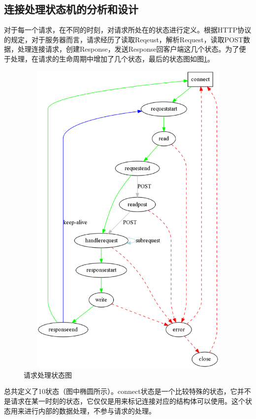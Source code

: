 \documentclass[twoside, xetex]{report}
\begin{document}
\subsection{连接处理状态机的分析和设计}
	对于每一个请求，在不同的时刻，对请求所处在的状态进行定义。根据HTTP协议的规定，对于服务器而言，请求经历了读取Reqeust，解析Request，读取POST数据，处理连接请求，创建Response，发送Response回客户端这几个状态。为了便于处理，在请求的生命周期中增加了几个状态，最后的状态图如图\ref{state}。
	\begin{figure}[t]
	\centering
	\includegraphics[height=16cm, width=12cm]{pics/state.eps}
	\caption{请求处理状态图}
	\label{state}
	\end{figure}
	
	总共定义了10状态（图中椭圆所示）。connect状态是一个比较特殊的状态，它并不是请求在某一时刻的状态，它仅仅是用来标记连接对应的结构体可以使用。这个状态用来进行内部的数据处理，不参与请求的处理。
	
\end{document}
